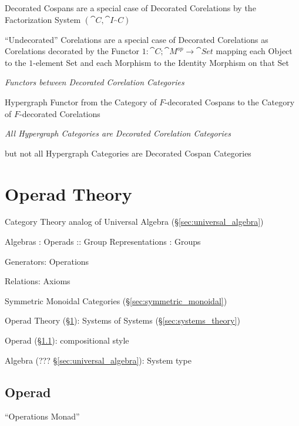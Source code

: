 Decorated Cospans are a special case of Decorated Corelations by the
Factorization System $(\cat{C},\cat{I}_\cat{C})$ %

``Undecorated'' Corelations are a special case of Decorated
Corelations as Corelations decorated by the Functor $1 :
\cat{C};\cat{M}^{op} \rightarrow \cat{Set}$ mapping each Object to the
$1$-element Set and each Morphism to the Identity Morphism on that Set


\emph{Functors between Decorated Corelation Categories} %

Hypergraph Functor from the Category of $F$-decorated Cospans to the
Category of $F$-decorated Corelations


\emph{All Hypergraph Categories are Decorated Corelation Categories}

but not all Hypergraph Categories are Decorated Cospan Categories



\section{Operad Theory}\label{sec:operad_theory}

Category Theory analog of Universal Algebra
(\S\ref{sec:universal_algebra})

Algebras : Operads :: Group Representations : Groups

Generators: Operations

Relations: Axioms

Symmetric Monoidal Categories
(\S\ref{sec:symmetric_monoidal})

Operad Theory (\S\ref{sec:operad_theory}): Systems of Systems
(\S\ref{sec:systems_theory})

Operad (\S\ref{sec:operad}): compositional style

Algebra (??? \S\ref{sec:universal_algebra}): System type



\subsection{Operad}\label{sec:operad}

``Operations Monad''


